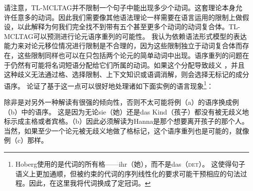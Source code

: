请注意，TL-MCLTAG并不限制一个句子中能出现多少个动词。这套理论本身允许任意多的动词。因此我们需要像其他语法理论一样需要在语言运用的限制上做假设，以此解释为何我们完全找不到带有五个甚至更多个动词的动词复合体。TL-MCLTAG可以预测进行论元语序重列的可能性。
我认为依赖语法形式模型的表达能力来对论元移位情况进行限制是不合理的，因为这些限制独立于动词复合体而存在，这些限制同样也可以在只包括两个论元的简单动词中出现。语序重列的问题在于仍然有可能将名词短语分配给它们所属的动词。如果这个分配导致歧义
，并且这种歧义无法通过格、选择限制、上下文知识或语调消解，则会选择无标记的成分语序。
 \citet*[]{Hoberg81a}论证了基于这一点可以很好地处理诸如下面实例的语言现象\footnote{%
Hoberg使用的是代词的所有格——ihr（她），而不是das（\textsc{det}）。
这使得句子语义上更加通顺，但被约束的代词的序列线性化的要求可能干预相应的句法过程。因此，在这里我将代词换成了定冠词。
}：
\eal
\judgewidth{\#}
\zl

\noindent
除非是对另外一种解读有很强的倾向性，否则不太可能将例（a）的语序换成例（b）中的语序。
这是因为无论sie（她）还是das Kind（孩子）都没有被无歧义地标示成主格或者宾格。（b）因此必须解读为Hanna是那个想要离开孩子的那个人。当然，如果至少一个论元被无歧义地做了格标记，这个语序重列也是可能的，就像例（c）那样。

